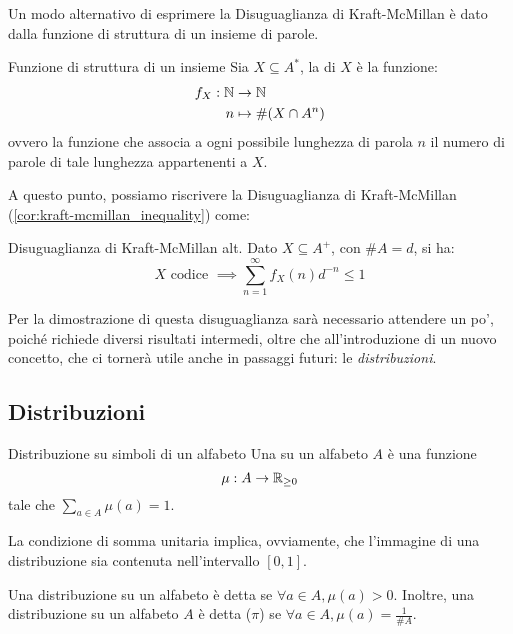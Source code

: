 Un modo alternativo di esprimere la Disuguaglianza di Kraft-McMillan è dato dalla funzione di struttura di un insieme di parole.
\begin{definition}[label=def:structure_function]{Funzione di struttura di un insieme}
  Sia \(X \subseteq A^*\), la  di \(X\) è la funzione:
  \begin{equation*}
    \begin{aligned}
      f_X: \mathbb{N} &\to \mathbb{N} \\
      n &\mapsto \#(X \cap A^n)
    \end{aligned}
  \end{equation*}
  ovvero la funzione che associa a ogni possibile lunghezza di parola \(n\) il numero di parole di tale lunghezza appartenenti a \(X\).
\end{definition}

A questo punto, possiamo riscrivere la Disuguaglianza di Kraft-McMillan (\ref{cor:kraft-mcmillan_inequality}) come:
\begin{corollary}[label=cor:kraft-mcmillan_inequality_alt]{Disuguaglianza di Kraft-McMillan alt.}
  Dato \(X \subseteq A^+\), con \(\# A = d\), si ha:
    \[X \text{ codice } \implies \sum_{n=1}^{\infty} f_X(n) d^{-n} \leq 1\]
\end{corollary}

Per la dimostrazione di questa disuguaglianza sarà necessario attendere un po', poiché richiede diversi risultati intermedi, oltre che all'introduzione di un nuovo concetto, che ci tornerà utile anche in passaggi futuri: le \emph{distribuzioni}.
\subsection{Distribuzioni}

\begin{definition}{Distribuzione su simboli di un alfabeto}
  Una  su un alfabeto \(A\) è una funzione
    \[\mu: A \to \mathbb{R}_{\geq 0}\]
  tale che \(\sum_{a \in A} \mu(a) = 1\).
\end{definition}
La condizione di somma unitaria implica, ovviamente, che l'immagine di una distribuzione sia contenuta nell'intervallo \([0,1]\).

Una distribuzione su un alfabeto è detta  se \(\forall a \in A, \mu(a) > 0\).
Inoltre, una distribuzione su un alfabeto \(A\) è detta  (\(\pi\)) se \(\forall a \in A, \mu(a) = \frac{1}{\# A}\).

